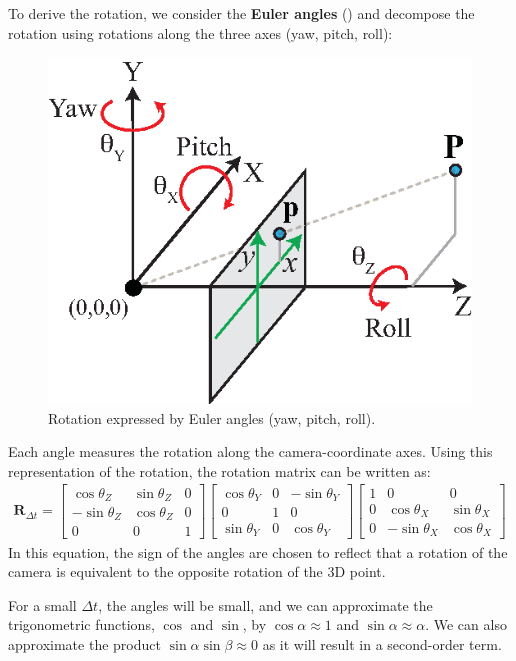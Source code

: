 To derive the rotation, we consider the {\bf Euler angles}  (\fig{\ref{fig:yaw_pitch_roll}}) and decompose the rotation using rotations along the three axes (yaw, pitch, roll):
\begin{figure}[h!]
\centerline{
\includegraphics[width=.4\linewidth]{figures/optical_flow/yaw_pitch_roll.eps}
} 
\caption{Rotation expressed by Euler angles (yaw, pitch, roll).}
\label{fig:yaw_pitch_roll}
\end{figure}

Each angle measures the rotation along the camera-coordinate axes. Using this representation of the rotation, the rotation matrix can be written as:
\begin{align}
\mathbf{R}_{\Delta t} = 
\begin{bmatrix}
\cos \theta_Z &  \sin \theta_Z & 0\\
-\sin \theta_Z &  \cos \theta_Z & 0\\
0 &  0 & 1
\end{bmatrix}
\begin{bmatrix}
\cos \theta_Y &  0 & -\sin \theta_Y\\
0 &  1 & 0\\
\sin \theta_Y &  0 & \cos \theta_Y
\end{bmatrix}
\begin{bmatrix}
1 &  0 & 0\\
0 & \cos \theta_X &  \sin \theta_X \\
0 & -\sin \theta_X &  \cos \theta_X 
\end{bmatrix}
\end{align}
In this equation, the sign of the angles are chosen to reflect that a rotation of the camera is equivalent to the opposite rotation of the 3D point. 

 For a small $\Delta t$, the angles will be small, and we can approximate the trigonometric functions, $\cos$ and $\sin$, by $\cos \alpha \approx 1$ and $\sin \alpha \approx \alpha$. We can also approximate the product $\sin \alpha \sin \beta \approx 0$ as it will result in a second-order term. 

